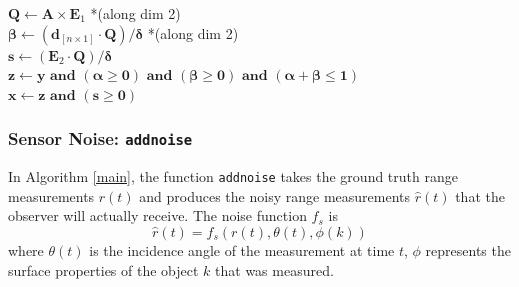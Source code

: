 \begin{singlespace}
\begin{algorithm}
{		$\mathbf{Q} \longleftarrow \mathbf{A} \times \mathbf{E}_1$ *(along dim 2)\\
		$\bm{\beta} \longleftarrow (\mathbf{d}_{[n \times 1]} \cdot \mathbf{Q})/\bm{\delta}$ *(along dim 2)\\
		$\mathbf{s} \longleftarrow (\mathbf{E}_2 \cdot \mathbf{Q})/\bm{\delta}$\\
		$\mathbf{z} \longleftarrow \mathbf{y} \textbf{ and } (\bm{\alpha} \geq \mathbf{0}) 
		\textbf{ and } (\bm{\beta} \geq \mathbf{0}) \textbf{ and } (\bm{\alpha}+\bm{\beta} \leq 
		\mathbf{1})$\\
		$\mathbf{x} \longleftarrow \mathbf{z} \textbf{ and } (\mathbf{s} \geq \mathbf{0})$ \label{line: intersectvec} \\
	}
	\caption{M{\"o}ller-Trumbore ray-triangle intersection} \label{intersectionalgorithm}
	\end{algorithm}
	\end{singlespace}
		
	\subsubsection{Sensor Noise: \texttt{addnoise}}
	In Algorithm \ref{main}, the function \texttt{addnoise} takes the ground truth range measurements $r(t)$ and produces the noisy range measurements $\hat{r}(t)$ that the observer will actually receive.
	The noise function $f_s$ is
	\begin{equation}
		\hat{r}(t) = f_s(r(t),\theta(t),\phi(k))
	\end{equation}
	where $\theta(t)$ is the incidence angle of the measurement at time $t$, $\phi$ represents the surface properties of the object $k$ that was measured.
	
